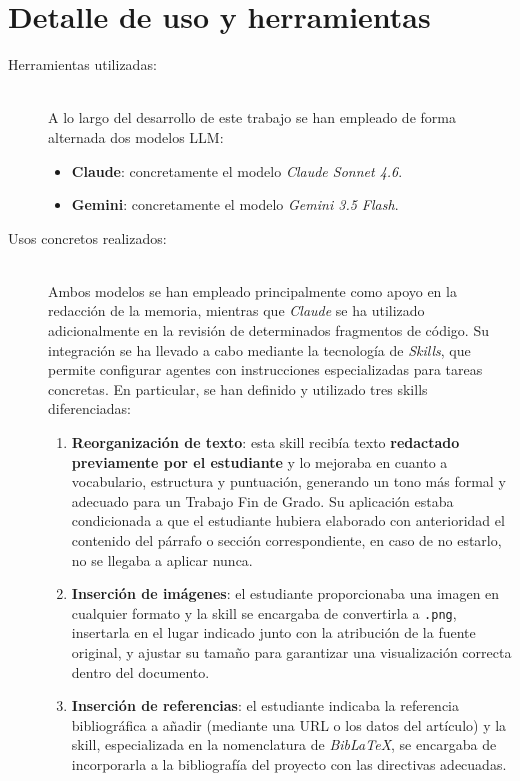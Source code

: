 \section*{Detalle de uso y herramientas}

\begin{description}
      \item[Herramientas utilizadas:] \hfill \\
            A lo largo del desarrollo de este trabajo se han empleado de forma alternada dos modelos LLM:
            \begin{itemize}
                  \item \textbf{Claude}: concretamente el modelo \textit{Claude Sonnet 4.6}.
                  \item \textbf{Gemini}: concretamente el modelo \textit{Gemini 3.5 Flash}.
            \end{itemize}

      \item[Usos concretos realizados:] \hfill \\
            Ambos modelos se han empleado principalmente como apoyo en la redacción de la memoria, mientras que \textit{Claude} se ha utilizado adicionalmente en la revisión de determinados fragmentos de código. Su integración se ha llevado a cabo mediante la tecnología de \textit{Skills}, que permite configurar agentes con instrucciones especializadas para tareas concretas. En particular, se han definido y utilizado tres skills diferenciadas:

            \begin{enumerate}
                  \item \textbf{Reorganización de texto}: esta skill recibía texto \textbf{redactado previamente por el estudiante} y lo mejoraba en cuanto a vocabulario, estructura y puntuación, generando un tono más formal y adecuado para un Trabajo Fin de Grado. Su aplicación estaba condicionada a que el estudiante hubiera elaborado con anterioridad el contenido del párrafo o sección correspondiente, en caso de no estarlo, no se llegaba a aplicar nunca.
                  \item \textbf{Inserción de imágenes}: el estudiante proporcionaba una imagen en cualquier formato y la skill se encargaba de convertirla a \texttt{.png}, insertarla en el lugar indicado junto con la atribución de la fuente original, y ajustar su tamaño para garantizar una visualización correcta dentro del documento.
                  \item \textbf{Inserción de referencias}: el estudiante indicaba la referencia bibliográfica a añadir (mediante una URL o los datos del artículo) y la skill, especializada en la nomenclatura de \textit{BibLaTeX}, se encargaba de incorporarla a la bibliografía del proyecto con las directivas adecuadas.
            \end{enumerate}


\end{description}
